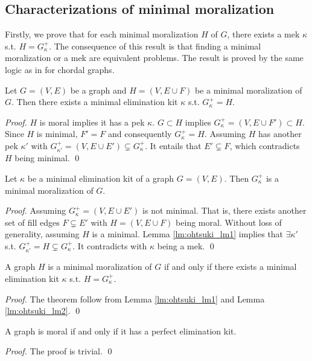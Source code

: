 \subsection{Characterizations of minimal moralization}
Firstly, we prove that for each minimal moralization $H$ of $G$, there exists a mek $\kappa$ s.t. $H=G_{\kappa}^+$. The consequence of this result is that finding a minimal moralization or a mek are equivalent problems. The result is proved by the same logic as in \cite{ohtsuki1976minimal} for chordal graphs. 
\begin{lemma}
\label{lm:ohtsuki_lm1}
Let $G=(V,E)$ be a graph and $H=(V,E\cup F)$ be a minimal moralization of $G$. Then there exists a minimal elimination kit $\kappa$ s.t. $G_{\kappa}^+=H$. 
\end{lemma}
\begin{proof}
$H$ is moral implies it has a pek $\kappa$. $G \subset H$ implies $G_{\kappa}^+=(V,E\cup F') \subset H$. Since $H$ is minimal, $F'=F$ and consequently $G_{\kappa}^+=H$. Assuming $H$ has another pek $\kappa'$ with $G_{\kappa'}^+ =(V,E\cup E') \subsetneq G_{\kappa}^+$. It entails that $E' \subsetneq F$, which contradicts $H$ being minimal. \qed
\end{proof}

\begin{lemma}
\label{lm:ohtsuki_lm2}
Let $\kappa$ be a minimal elimination kit of a graph $G=(V,E)$. Then $G_{\kappa}^+$ is a minimal moralization of $G$. 
\end{lemma}
\begin{proof}
Assuming $G_{\kappa}^+=(V,E\cup E')$ is not minimal. That is, there exists another set of fill edges $F\subsetneq E'$ with $H=(V,E\cup F)$ being moral. Without loss of generality, assuming $H$ is a minimal. Lemma \ref{lm:ohtsuki_lm1} implies that $\exists \kappa'$ s.t. $G_{\kappa'}^+=H \subsetneq G_{\kappa}^+$. It contradicts with $\kappa$ being a mek. \qed
\end{proof}

\begin{theorem}
\label{thm:ohtsuki_thm1}
A graph $H$ is a minimal moralization of $G$ if and only if there exists a minimal elimination kit $\kappa$ s.t. $H=G_{\kappa}^+$.
\end{theorem}
\begin{proof}
The theorem follow from Lemma \ref{lm:ohtsuki_lm1} and Lemma \ref{lm:ohtsuki_lm2}. \qed 
\end{proof}

\begin{theorem}
A graph is moral if and only if it has a perfect elimination kit. 
\end{theorem}
\begin{proof}
The proof is trivial. \qed
\end{proof}

